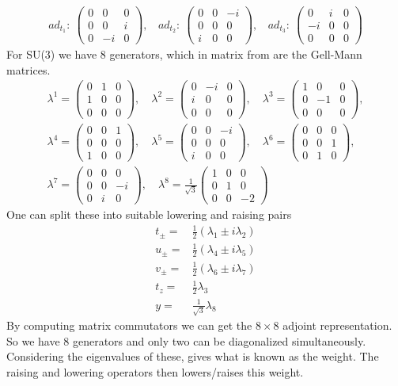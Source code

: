 \documentclass[a4paper,12pt]{article}
\newcommand\matthree[9]{%
	\begin{pmatrix}
		#1 & #2 & #3 \\ #4 & #5 & #6 \\ #7 & #8 & #9
	\end{pmatrix}%
}
\begin{document}
\begin{equation}
	\begin{aligned}
			ad_{t_1}:~\begin{pmatrix}
				0 & 0 & 0\\
				0 & 0 & i\\
				0 & -i & 0
			\end{pmatrix},~~~~
			ad_{t_2}:~\begin{pmatrix}
			0 & 0 & -i\\
			0 & 0 & 0\\
			i & 0 & 0
		\end{pmatrix},~~~~
	ad_{t_3}:~\begin{pmatrix}
	0 & i & 0\\
	-i & 0 & 0\\
	0 & 0 & 0
\end{pmatrix}
	\end{aligned}
\end{equation}
For SU(3) we have 8 generators, which in matrix from are the Gell-Mann matrices.
\begin{gather*}
	\lambda^1 = \matthree {0}{1}{0}{1}{0}{0}{0}{0}{0},\quad
	\lambda^2 = \matthree {0}{-i}{0}{i}{0}{0}{0}{0}{0},\quad
	\lambda^3 = \matthree {1}{0}{0}{0}{-1}{0}{0}{0}{0},\\[1ex]
	\lambda^4 = \matthree {0}{0}{1}{0}{0}{0}{1}{0}{0},\quad
	\lambda^5 = \matthree {0}{0}{-i}{0}{0}{0}{i}{0}{0},\quad
	\lambda^6 = \matthree {0}{0}{0}{0}{0}{1}{0}{1}{0},\\[1ex]
	\lambda^7 = \matthree {0}{0}{0}{0}{0}{-i}{0}{i}{0},\quad
	\lambda^8 = \frac{1}{\sqrt{3}} \matthree {1}{0}{0}{0}{1}{0}{0}{0}{-2}
\end{gather*}
One can split these into suitable lowering and raising pairs
\begin{equation}
	\begin{aligned}
		t_\pm=& \frac{1}{2}(\lambda_1\pm i\lambda_2)\\
		u_\pm=& \frac{1}{2}(\lambda_4\pm i\lambda_5)\\
			v_\pm=& \frac{1}{2}(\lambda_6\pm i\lambda_7)\\
			t_z=&\frac{1}{2}\lambda_3\\
			y=&\frac{1}{\sqrt{3}}\lambda_8
	\end{aligned}
\end{equation}
By computing matrix commutators we can get the $8\times 8$ adjoint representation.
So we have 8 generators and only two can be diagonalized simultaneously. Considering the eigenvalues of these, gives what is known as the weight. The raising and lowering operators then lowers/raises this weight.
\newpage
\end{document}
